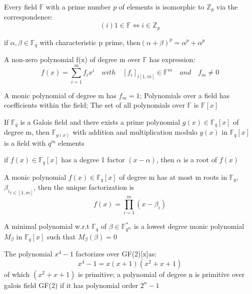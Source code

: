 \documentclass[12pt,a4paper,violet]{bbe}
\begin{document}
\begin{theorem}
Every field \(\mathbb{F}\) with a prime number \(p\) of elements is isomorphic to \(\mathbb{Z}_p\) via the correspondence:
\begin{equation}
    (i)1 \in \mathbb{F}\Leftrightarrow i \in \mathbb{Z}_p
\end{equation}
\end{theorem}
\begin{theorem}
if \(\alpha,\beta \in \mathbb{F}_q\) with characteristic p prime, then\((\alpha +\beta)^p=\alpha^p+\alpha^p\)
\end{theorem}
\begin{definition}
    A non-zero polynomial f(x) of degree m over \(\mathbb{F}\) has expression:
    \begin{equation}
        f(x)=\sum_{i=1}^m f_ix^i \quad with \quad [f_i]_{i[1,m]} \in \mathbb{F}^m \quad and \quad f_m \neq 0
    \end{equation}
\end{definition}
\begin{remark}
A monic polynomial of degree m has \(f_m=1\); Polynomials over a field has coefficients within the field; The set of all polynomials over \(\mathbb{F}\) is \(\mathbb{F}[x]\)
\end{remark}
\begin{theorem}
If \(\mathbb{F}_q\) is a Galois field and there exists a prime polynomial \(g(x) \in \mathbb{F}_q[x]\) of degree m, then \(\mathbb{F}_{g(x)}\) with addition and multiplication modulo \(g(x)\) in \(\mathbb{F}_q[x]\) is a field with \(q^m\) elements
\end{theorem}
\begin{definition}
if \(f(x) \in \mathbb{F}_q[x]\) has a degree 1 factor \((x-\alpha)\), then \(\alpha\) is a root of \(f(x)\)
\end{definition}
\begin{theorem}
A monic polynomial \(f(x) \in \mathbb{F}_q[x]\) of degree m has at most m roots in \(\mathbb{F}_q\), \({\beta_i}_{i \in [1,m]}\), then the unique factorization is
\begin{equation}
    f(x)=\prod_{i=1}^m (x-\beta_i)
\end{equation}
\end{theorem}
\begin{theorem}
A minimal polynomial w.r.t \(\mathbb{F}_q\) of \(\beta \in \mathbb{F}^*_{q^m}\) is a lowest degree monic polynomial \(M_\beta\) in \(\mathbb{F}_q[x]\) such that \(M_\beta(\beta)=0\)
\end{theorem}
\begin{remark}
The polynomial \(x^4-1\) factorizes over GF(2)[x]as:
\begin{equation}
    x^4-1=x(x+1)(x^2+x+1)
\end{equation}
of which \((x^2+x+1)\) is primitive; a polynomial of degree n is primitive over galois field GF(2) if it has polynomial order \(2^n-1\)
\end{remark}
\end{document}
